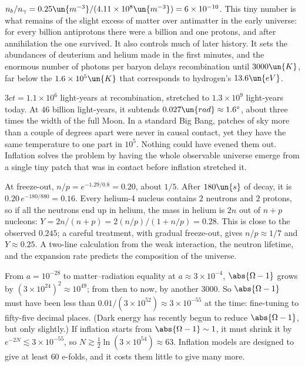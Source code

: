  $n_b/n_\gamma = 0.25\un{m^{-3}}/(4.11\times10^8\un{m^{-3}}) = 6\times10^{-10}$. This tiny number is what remains of the slight excess of matter over antimatter in the early universe: for every billion antiprotons there were a billion and one protons, and after annihilation the one survived. It also controls much of later history. It sets the abundances of deuterium and helium made in the first minutes, and the enormous number of photons per baryon delays recombination until $3000\un{K}$, far below the $1.6\times10^5\un{K}$ that corresponds to hydrogen's $13.6\un{eV}$.

 $3ct = 1.1\times10^{6}$ light-years at recombination, stretched to $1.3\times10^9$ light-years today. At $46$ billion light-years, it subtends $0.027\un{rad}\approx1.6^\circ$, about three times the width of the full Moon. In a standard Big Bang, patches of sky more than a couple of degrees apart were never in causal contact, yet they have the same temperature to one part in $10^5$. Nothing could have evened them out. Inflation solves the problem by having the whole observable universe emerge from a single tiny patch that was in contact before inflation stretched it.

 At freeze-out, $n/p = e^{-1.29/0.8} = 0.20$, about $1/5$. After $180\un{s}$ of decay, it is $0.20\,e^{-180/880} = 0.16$. Every helium-4 nucleus contains $2$ neutrons and $2$ protons, so if all the neutrons end up in helium, the mass in helium is $2n$ out of $n+p$ nucleons: $Y = 2n/(n+p) = 2(n/p)/(1+n/p) = 0.28$. This is close to the observed $0.245$; a careful treatment, with gradual freeze-out, gives $n/p\approx1/7$ and $Y\approx0.25$. A two-line calculation from the weak interaction, the neutron lifetime, and the expansion rate predicts the composition of the universe.

 From $a = 10^{-28}$ to matter--radiation equality at $a\approx3\times10^{-4}$, $\abs{\Omega-1}$ grows by $(3\times10^{24})^2\approx10^{49}$; from then to now, by another $3000$. So $\abs{\Omega-1}$ must have been less than $0.01/(3\times10^{52})\approx3\times10^{-55}$ at the time: fine-tuning to fifty-five decimal places. (Dark energy has recently begun to reduce $\abs{\Omega-1}$, but only slightly.) If inflation starts from $\abs{\Omega-1}\sim1$, it must shrink it by $e^{-2N}\lesssim3\times10^{-55}$, so $N\gtrsim\tfrac12\ln(3\times10^{54})\approx63$. Inflation models are designed to give at least $60$ e-folds, and it costs them little to give many more.

